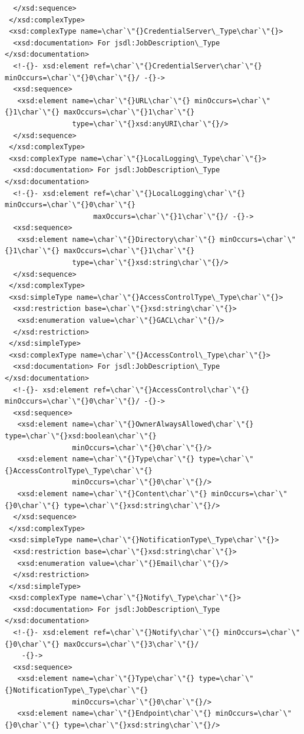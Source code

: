 \documentclass{article}                            %
\begin{document}
\begin{footnotesize}
\begin{verbatim}
  </xsd:sequence>
 </xsd:complexType>
 <xsd:complexType name=\char`\"{}CredentialServer\_Type\char`\"{}>
  <xsd:documentation> For jsdl:JobDescription\_Type </xsd:documentation>
  <!-{}- xsd:element ref=\char`\"{}CredentialServer\char`\"{} minOccurs=\char`\"{}0\char`\"{}/ -{}->
  <xsd:sequence>
   <xsd:element name=\char`\"{}URL\char`\"{} minOccurs=\char`\"{}1\char`\"{} maxOccurs=\char`\"{}1\char`\"{}
                type=\char`\"{}xsd:anyURI\char`\"{}/>
  </xsd:sequence>
 </xsd:complexType>
 <xsd:complexType name=\char`\"{}LocalLogging\_Type\char`\"{}>
  <xsd:documentation> For jsdl:JobDescription\_Type </xsd:documentation>
  <!-{}- xsd:element ref=\char`\"{}LocalLogging\char`\"{} minOccurs=\char`\"{}0\char`\"{}
                     maxOccurs=\char`\"{}1\char`\"{}/ -{}->
  <xsd:sequence>
   <xsd:element name=\char`\"{}Directory\char`\"{} minOccurs=\char`\"{}1\char`\"{} maxOccurs=\char`\"{}1\char`\"{}
                type=\char`\"{}xsd:string\char`\"{}/>
  </xsd:sequence>
 </xsd:complexType>
 <xsd:simpleType name=\char`\"{}AccessControlType\_Type\char`\"{}>
  <xsd:restriction base=\char`\"{}xsd:string\char`\"{}>
   <xsd:enumeration value=\char`\"{}GACL\char`\"{}/>
  </xsd:restriction>
 </xsd:simpleType>
 <xsd:complexType name=\char`\"{}AccessControl\_Type\char`\"{}>
  <xsd:documentation> For jsdl:JobDescription\_Type </xsd:documentation>
  <!-{}- xsd:element ref=\char`\"{}AccessControl\char`\"{} minOccurs=\char`\"{}0\char`\"{}/ -{}->
  <xsd:sequence>
   <xsd:element name=\char`\"{}OwnerAlwaysAllowed\char`\"{} type=\char`\"{}xsd:boolean\char`\"{}
                minOccurs=\char`\"{}0\char`\"{}/>
   <xsd:element name=\char`\"{}Type\char`\"{} type=\char`\"{}AccessControlType\_Type\char`\"{}
                minOccurs=\char`\"{}0\char`\"{}/>
   <xsd:element name=\char`\"{}Content\char`\"{} minOccurs=\char`\"{}0\char`\"{} type=\char`\"{}xsd:string\char`\"{}/>
  </xsd:sequence>
 </xsd:complexType>
 <xsd:simpleType name=\char`\"{}NotificationType\_Type\char`\"{}>
  <xsd:restriction base=\char`\"{}xsd:string\char`\"{}>
   <xsd:enumeration value=\char`\"{}Email\char`\"{}/>
  </xsd:restriction>
 </xsd:simpleType>
 <xsd:complexType name=\char`\"{}Notify\_Type\char`\"{}>
  <xsd:documentation> For jsdl:JobDescription\_Type </xsd:documentation>
  <!-{}- xsd:element ref=\char`\"{}Notify\char`\"{} minOccurs=\char`\"{}0\char`\"{} maxOccurs=\char`\"{}3\char`\"{}/
    -{}->
  <xsd:sequence>
   <xsd:element name=\char`\"{}Type\char`\"{} type=\char`\"{}NotificationType\_Type\char`\"{}
                minOccurs=\char`\"{}0\char`\"{}/>
   <xsd:element name=\char`\"{}Endpoint\char`\"{} minOccurs=\char`\"{}0\char`\"{} type=\char`\"{}xsd:string\char`\"{}/>

\end{verbatim}
\end{footnotesize}
\end{document}
